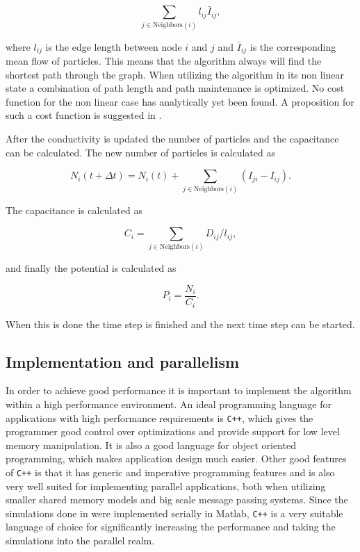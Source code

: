 \begin{equation}
\sum_{j \in \text{Neighbors}(i)} l_{ij} \bar{I}_{ij},
\end{equation}

 \noindent where $l_{ij}$ is the edge length between node $i$ and $j$ and $\bar{I}_{ij}$ is the corresponding mean flow of particles. This means that the algorithm always will find the shortest path through the graph. When utilizing the algorithm in its non linear state a combination of path length and path maintenance is optimized. No cost function for the non linear case has analytically yet been found. A proposition for such a cost function is suggested in \cite{Sumpter}. 

After the conductivity is updated the number of particles and the capacitance can be calculated. The new number of particles is calculated as

 \begin{equation}
 N_i(t + \Delta t) = N_i(t) + \sum_{j \in \text{Neighbors}(i)} \left( I_{ji} - I_{ij} \right).
 \end{equation}

 \noindent The capacitance is calculated as 

 \begin{equation}
 C_i = \sum_{j \in \text{Neighbors}(i)} D_{ij}/l_{ij},
 \end{equation}
 
 \noindent and finally the potential is calculated as
 
 \begin{equation}
 P_i = \frac{N_i}{C_i}.
 \end{equation}
 
 \noindent When this is done the time step is finished and the next time step can be started.

\subsection{Implementation and parallelism} 
\label{sec:parallel}
In order to achieve good performance it is important to implement the algorithm within a high performance environment. An ideal programming language for applications with high performance requirements is \texttt{C++}, which gives the programmer good control over optimizations and provide support for low level memory manipulation. It is also a good language for object oriented programming, which makes application design much easier. Other good features of \texttt{C++} is that it has generic and imperative programming features and is also very well suited for implementing parallel applications, both when utilizing smaller shared memory models and big scale message passing systems. Since the simulations done in \cite{Sumpter} were implemented serially in Matlab, \texttt{C++} is a very suitable language of choice for significantly increasing the performance and taking the simulations into the parallel realm.


